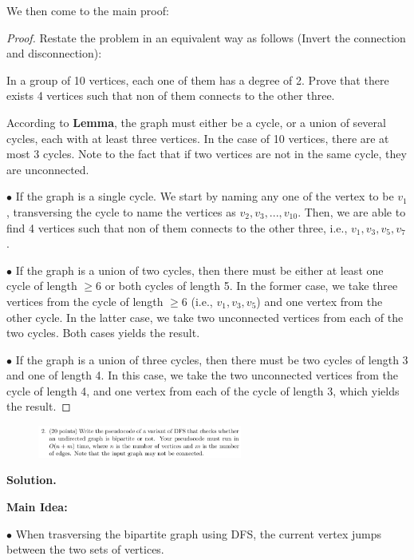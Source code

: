 \documentclass[10pt]{article}
\begin{document}
We then come to the main proof:
\begin{proof}
	Restate the problem in an equivalent way as follows (Invert the connection and disconnection):

	In a group of 10 vertices, each one of them has a degree of 2. Prove that there exists 4 vertices such that non of them connects to the other three.

	According to \textbf{Lemma}, the graph must either be a cycle, or a union of several cycles, each with at least three vertices. In the case of 10 vertices, there are at most 3 cycles. Note to the fact that if two vertices are not in the same cycle, they are unconnected.
	
	$\bullet$ If the graph is a single cycle. We start by naming any one of the vertex to be $v_1$, transversing the cycle to name the vertices as $v_2, v_3, ..., v_{10}$. Then, we are able to find 4 vertices such that non of them connects to the other three, i.e., $v_1, v_3, v_5, v_7$.
	
	$\bullet$ If the graph is a union of two cycles, then there must be either at least one cycle of length $\geq 6$ or both cycles of length 5. In the former case, we take three vertices from the cycle of length $\geq 6$ (i.e., $v_1, v_3, v_5$) and one vertex from the other cycle. In the latter case, we take two unconnected vertices from each of the two cycles. Both cases yields the result.

	$\bullet$ If the graph is a union of three cycles, then there must be two cycles of length 3 and one of length 4. In this case, we take the two unconnected vertices from the cycle of length 4, and one vertex from each of the cycle of length 3, which yields the result.

\end{proof}

\newpage

\begin{figure}[h]
	\centering
	\includegraphics[width=0.6\textwidth]{hw4-2}
\end{figure}

\textbf{Solution.}

\textbf{Main Idea:}

$\bullet$ When trasversing the bipartite graph using DFS, the current vertex jumps between the two sets of vertices.
\end{document}
